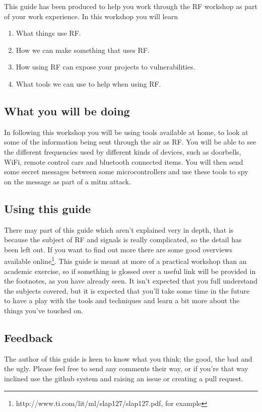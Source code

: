 This guide has been produced to help you work through the \gls{RF} workshop as part of your work experience. In this workshop you will learn \begin{enumerate}\item What things use \gls{RF}. \item How we can make something that uses \gls{RF}. \item How using \gls{RF} can expose your projects to vulnerabilities. \item What tools we can use to help when using \gls{RF}.\end{enumerate}

\subsection{What you will be doing}
In following this workshop you will be using tools available at home, to look at some of the information being sent through the air as \gls{RF}. You will be able to see the different frequencies used by different kinds of devices, such as doorbells, WiFi, remote control cars and bluetooth connected items. You will then send some secret messages between some microcontrollers and use these tools to spy on the message as part of a \gls{mitm} attack.

\subsection{Using this guide}
There may part of this guide which aren't explained very in depth, that is because the subject of \gls{RF} and signals is really complicated, so the detail has been left out. If you want to find out more there are some good overviews available online\footnote{http://www.ti.com/lit/ml/slap127/slap127.pdf, for example}. This guide is meant at more of a practical workshop than an academic exercise, so if something is glossed over a useful link will be provided in the footnotes, as you have already seen. It isn't expected that you full understand the subjects covered, but it is expected that you'll take some time in the future to have a play with the tools and techniques and learn a bit more about the things you've touched on.

\subsection{Feedback}
The author of this guide is keen to know what you think; the good, the bad and the ugly. Please feel free to send any comments their way, or if you're that way inclined use the github system and raising an issue or creating a pull request. 
